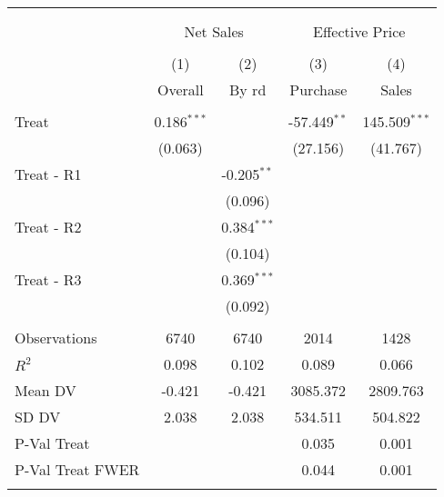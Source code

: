 
\begin{tabular}{@{\extracolsep{5pt}}lcccc}
\\[-1.8ex]\hline
\hline \\[-1.8ex]
\\[-1.8ex] & \multicolumn{2}{c}{Net Sales} & \multicolumn{2}{c}{Effective Price}  \\
\\[-1.8ex] & (1) & (2) & (3) & (4) 
 \\ & Overall & By rd & Purchase & Sales \\
\hline \\[-1.8ex]
 Treat & 0.186$^{***}$ & & -57.449$^{**}$ & 145.509$^{***}$ \\
& (0.063) & & (27.156) & (41.767) \\
 Treat - R1 & & -0.205$^{**}$ & & \\
& & (0.096) & & \\
 Treat - R2 & & 0.384$^{***}$ & & \\
& & (0.104) & & \\
 Treat - R3 & & 0.369$^{***}$ & & \\
& & (0.092) & & \\
\hline \\[-1.8ex]
 Observations & 6740 & 6740 & 2014 & 1428 \\
 $R^2$ & 0.098 & 0.102 & 0.089 & 0.066 \\
 Mean DV & -0.421 & -0.421 & 3085.372 & 2809.763 \\
 SD DV & 2.038 & 2.038 & 534.511 & 504.822 \\
 P-Val Treat &  &  & 0.035 & 0.001 \\
 P-Val Treat FWER &  &  & 0.044 & 0.001 \\
\hline
\hline \\[-1.8ex]
\end{tabular}
